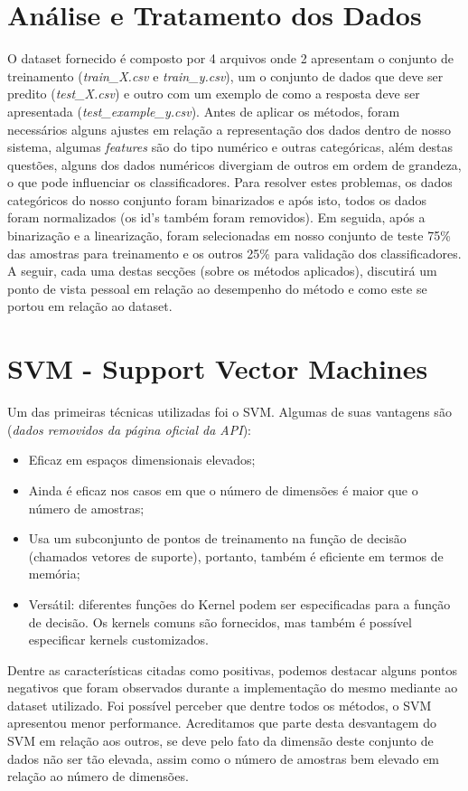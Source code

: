 \documentclass[
	12pt,				    %
	openright,			    %
	oneside,			    %
	a4paper,			    %
    sumario=tradicional,    %
	english,			    %
	brazil,				    %
	]{abntex2}
\begin{document}
\section{Análise e Tratamento dos Dados}\label{sec:tratamentoDados}
O dataset fornecido é composto por 4 arquivos onde 2 apresentam o conjunto de treinamento (\textit{train\_X.csv} e \textit{train\_y.csv}), um o conjunto de dados que deve ser predito (\textit{test\_X.csv}) e outro com um exemplo de como a resposta deve ser apresentada (\textit{test\_example\_y.csv}).
Antes de aplicar os métodos, foram necessários alguns ajustes em relação a representação dos dados dentro de nosso sistema, algumas \textit{features} são do tipo numérico e outras categóricas, além destas questões, alguns dos dados numéricos divergiam de outros em ordem de grandeza, o que pode influenciar os classificadores. Para resolver estes problemas, os dados categóricos do nosso conjunto foram binarizados e após isto, todos os dados foram normalizados (os id's também foram removidos).
Em seguida, após a binarização e a linearização, foram selecionadas em nosso conjunto de teste 75\% das amostras para treinamento e os outros 25\% para validação dos classificadores.
A seguir, cada uma destas secções (sobre os métodos aplicados), discutirá um ponto de vista pessoal em relação ao desempenho do método e como este se portou em relação ao dataset.


\section{SVM - Support Vector Machines}\label{sec:SVM}
Um das primeiras técnicas utilizadas foi o SVM.
Algumas de suas vantagens são (\textit{dados removidos da página oficial da API}):
\begin{itemize}
\item Eficaz em espaços dimensionais elevados;
\item Ainda é eficaz nos casos em que o número de dimensões é maior que o número de amostras;
\item Usa um subconjunto de pontos de treinamento na função de decisão (chamados vetores de suporte), portanto, também é eficiente em termos de memória;
\item Versátil: diferentes funções do Kernel podem ser especificadas para a função de decisão. Os kernels comuns são fornecidos, mas também é possível especificar kernels customizados.
\end{itemize}
Dentre as características citadas como positivas, podemos destacar alguns pontos negativos que foram observados durante a implementação do mesmo mediante ao dataset utilizado. Foi possível perceber que dentre todos os métodos, o SVM apresentou menor performance. Acreditamos que parte desta desvantagem do SVM em relação aos outros, se deve pelo fato da dimensão deste conjunto de dados não ser tão elevada, assim como o número de amostras bem elevado em relação ao número de dimensões.
\end{document}
